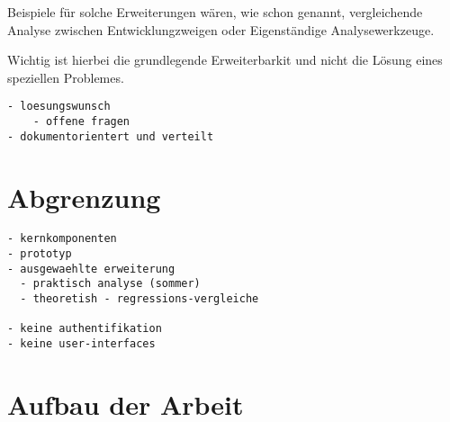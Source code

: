 Beispiele f\"ur solche Erweiterungen wären,
wie schon genannt,
vergleichende Analyse zwischen Entwicklungzweigen oder Eigenständige Analysewerkzeuge.

Wichtig ist hierbei die grundlegende Erweiterbarkit
und nicht die L\"osung eines speziellen Problemes.


\begin{verbatim}
- loesungswunsch
    - offene fragen
- dokumentorientert und verteilt
\end{verbatim}

\section{Abgrenzung}

\begin{verbatim}
- kernkomponenten
- prototyp
- ausgewaehlte erweiterung
  - praktisch analyse (sommer)
  - theoretish - regressions-vergleiche

- keine authentifikation
- keine user-interfaces

\end{verbatim}

\section{Aufbau der Arbeit}


